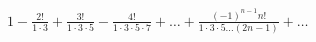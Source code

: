 \item $\displaystyle 1 - \frac{2!}{1 \cdot 3} + \frac{3!}{1 \cdot 3 \cdot 5} - \frac{4!}{1 \cdot 3 \cdot 5 \cdot 7} + \dots + \frac{(-1)^{n-1} n!}{1 \cdot 3 \cdot 5 \dots (2n-1)} + \dots$
